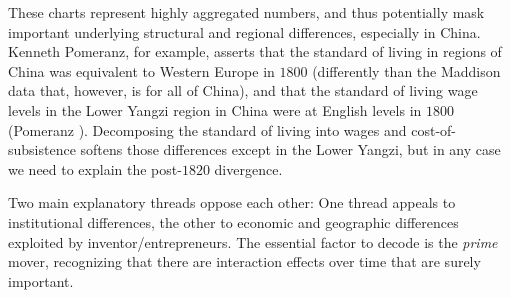 \documentclass[12pt]{article}
\numberwithin{equation}{section}
\begin{document}

		
		These charts represent highly aggregated numbers, and thus potentially mask important underlying structural and regional differences, especially in China. Kenneth Pomeranz, for example, asserts that the standard of living in regions of China was equivalent to Western Europe in $1800$ (differently than the Maddison data that, however, is for all of China), and that the standard of living wage levels in the Lower Yangzi region in China were at English levels in $1800$ (Pomeranz \citeyear[p.~107]{pomeranz_great_2001}). Decomposing the standard of living into wages and cost-of-subsistence softens those differences except in the Lower Yangzi, but in any case we need to explain the post-$1820$ divergence.
		
		Two main explanatory threads oppose each other: One thread appeals to institutional differences, the other to economic and geographic differences exploited by inventor/entrepreneurs. The essential factor to decode is the \textit{prime} mover, recognizing that there are interaction effects over time that are surely important.
		
\end{document}
